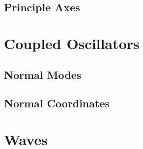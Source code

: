 \documentclass[main.tex]{subfiles}
\begin{document}
\section{Principle Axes}

\chapter{Coupled Oscillators}

\section{Normal Modes}

\section{Normal Coordinates}

\chapter{Waves}
\end{document}
